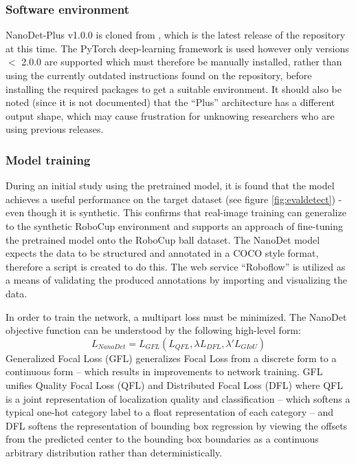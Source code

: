 \documentclass[a4paper,twoside,12pt]{report}
\begin{document}

\subsubsection{Software environment}

NanoDet-Plus v1.0.0 is cloned from \cite{nanodet}, which is the latest release of the repository at this time. The PyTorch deep-learning framework is used however only versions $<$ 2.0.0 are supported which must therefore be manually installed, rather than using the currently outdated instructions found on the repository, before installing the required packages to get a suitable environment. It should also be noted (since it is not documented) that the ``Plus'' architecture has a different output shape, which may cause frustration for unknowing researchers who are using previous releases.

\subsubsection{Model training}

During an initial study using the pretrained model, it is found that the model achieves a useful performance on the target dataset (see figure \ref{fig:evaldetect}) - even though it is synthetic. This confirms that real-image training can generalize to the synthetic RoboCup environment and supports an approach of fine-tuning the pretrained model onto the RoboCup ball dataset. The NanoDet model expects the data to be structured and annotated in a COCO style format, therefore a script is created to do this. The web service ``Roboflow'' \citep{roboflow} is utilized as a means of validating the produced annotations by importing and visualizing the data. 

In order to train the network, a multipart loss must be minimized. The NanoDet objective function can be understood by the following high-level form:
\begin{equation}
L_{NanoDet} =  L_{GFL}(L_{QFL}, \lambda L_{DFL}, \lambda' L_{GIoU})
\end{equation} 
Generalized Focal Loss (GFL) \citep{gflloss} generalizes Focal Loss from a discrete form to a continuous form -- which results in improvements to network training. GFL unifies Quality Focal Loss (QFL) and Distributed Focal Loss (DFL) where QFL is a joint representation of localization quality and classification -- which softens a typical one-hot category label to a float representation of each category -- and DFL softens the representation of bounding box regression by viewing the offsets from the predicted center to the bounding box boundaries as a continuous arbitrary distribution rather than deterministically.
\end{document}
